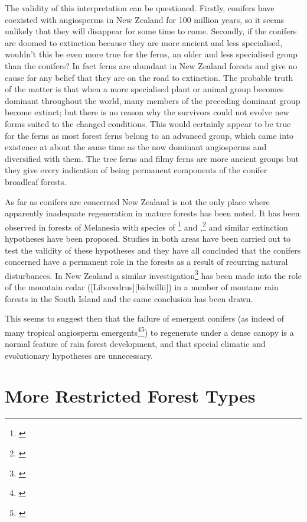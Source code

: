 The validity of this interpretation can be questioned.
Firstly, conifers have coexisted with angiosperms in New Zealand for 100 million years, so it seems unlikely that they will disappear for some time to come.
Secondly, if the conifers are doomed to extinction because they are more ancient and less specialised, wouldn't this be even more true for the ferns, an older and less specialised group than the conifers? In fact ferns are abundant in New Zealand forests and give no cause for any belief that they are on the road to extinction.
The probable truth of the matter is that when a more specialised plant or animal group becomes dominant throughout the world, many members of the preceding dominant group become extinct; but there is no reason why the survivors could not evolve new forms suited to the changed conditions.
This would certainly appear to be true for the ferns as most forest ferns belong to an advanced group, which came into existence at about the same time as the now dominant angiosperms and diversified with them.
The tree ferns and filmy ferns are more ancient groups but they give every indication of being permanent components of the conifer broadleaf forests.

As far as conifers are concerned New Zealand is not the only place where apparently inadequate regeneration in mature forests has been noted.
It has been observed in forests of Melanesia with species of \footnote{\cite{havel1971araucaria}} and ,\footnote{\cite{whitmore1966social}} and similar extinction hypotheses have been proposed.
Studies in both areas have been carried out to test the validity of these hypotheses and they have all concluded that the conifers concerned have a permanent role in the forests as a result of recurring natural disturbances.
In New Zealand a similar investigation\footnote{\cite{veblen1982conifer}} has been made into the role of the mountain cedar ([Libocedrus][bidwillii]) in a number of montane rain forests in the South Island and the same conclusion has been drawn.

This seems to suggest then that the failure of emergent conifers (as indeed of many tropical angiosperm emergents\footnote{\cite{whitmore1975tropical}}\footnote{\cite{jones1956ecological}}) to regenerate under a dense canopy is a normal feature of rain forest development, and that special climatic and evolutionary hypotheses are unnecessary.

\section{More Restricted Forest Types}

